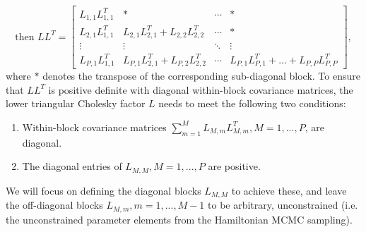 \documentclass[aoas,preprint]{imsart}
\begin{document}
\begin{equation*}
\text{then } L L^T = 
\begin{bmatrix}
L_{1,1}L_{1,1}^T & * & \cdots & * \\
L_{2,1}L_{1,1}^T & L_{2,1}L_{2,1}^T + L_{2,2}L_{2,2}^T & \cdots  & * \\
\vdots & \vdots & \ddots & \vdots \\
L_{P,1}L_{1,1}^T & L_{P,1}L_{2,1}^T +  L_{P,2}L_{2,2}^T& \cdots & L_{P,1}L_{P,1}^T + ... + L_{P,P}L_{P,P}^T
\end{bmatrix},
\end{equation*}
where $*$ denotes the transpose of the corresponding sub-diagonal block. To ensure that $L L^T$ is positive definite with diagonal within-block covariance matrices, the lower triangular Cholesky factor $L$ needs to meet the following two conditions:
\begin{enumerate}
\item Within-block covariance matrices $\sum_{m=1}^{M} L_{M,m} L_{M,m}^T, M = 1, ..., P$, are diagonal.
\item The diagonal entries of $L_{M,M}, M = 1, ..., P$ are positive.
\end{enumerate}
We will focus on defining the diagonal blocks $L_{M, M}$ to achieve these, and leave the off-diagonal blocks $L_{M, m}, m = 1, ..., M-1$ to be arbitrary, unconstrained (i.e. the unconstrained parameter elements from the Hamiltonian MCMC sampling). 
\end{document}

